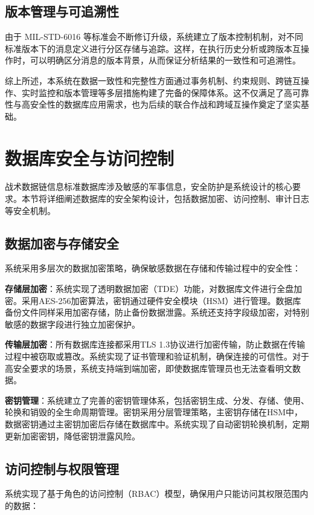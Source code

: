 \subsection{版本管理与可追溯性}
由于 {MIL-STD-6016} 等标准会不断修订升级，系统建立了版本控制机制，对不同标准版本下的消息定义进行分区存储与追踪。这样，在执行历史分析或跨版本互操作时，可以明确区分消息的版本背景，从而保证分析结果的一致性和可追溯性。

综上所述，本系统在数据一致性和完整性方面通过事务机制、约束规则、跨链互操作、实时监控和版本管理等多层措施构建了完备的保障体系。这不仅满足了高可靠性与高安全性的数据库应用需求，也为后续的联合作战和跨域互操作奠定了坚实基础。

\section{数据库安全与访问控制}

战术数据链信息标准数据库涉及敏感的军事信息，安全防护是系统设计的核心要求。本节将详细阐述数据库的安全架构设计，包括数据加密、访问控制、审计日志等安全机制。

\subsection{数据加密与存储安全}

系统采用多层次的数据加密策略，确保敏感数据在存储和传输过程中的安全性：

\textbf{存储层加密}：系统实现了透明数据加密（TDE）功能，对数据库文件进行全盘加密。采用AES-256加密算法，密钥通过硬件安全模块（HSM）进行管理。数据库备份文件同样采用加密存储，防止备份数据泄露。系统还支持字段级加密，对特别敏感的数据字段进行独立加密保护。

\textbf{传输层加密}：所有数据库连接都采用TLS 1.3协议进行加密传输，防止数据在传输过程中被窃取或篡改。系统实现了证书管理和验证机制，确保连接的可信性。对于高安全要求的场景，系统支持端到端加密，即使数据库管理员也无法查看明文数据。

\textbf{密钥管理}：系统建立了完善的密钥管理体系，包括密钥生成、分发、存储、使用、轮换和销毁的全生命周期管理。密钥采用分层管理策略，主密钥存储在HSM中，数据密钥通过主密钥加密后存储在数据库中。系统实现了自动密钥轮换机制，定期更新加密密钥，降低密钥泄露风险。

\subsection{访问控制与权限管理}

系统实现了基于角色的访问控制（RBAC）模型，确保用户只能访问其权限范围内的数据：

